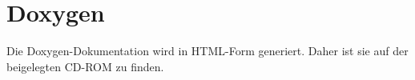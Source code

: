%
%
\chapter{Doxygen}\label{ch:doxygen}
	Die Doxygen-Dokumentation wird in \textsf{HTML}-Form generiert. Daher ist sie auf der beigelegten CD-ROM zu finden.
%	
%	
%	
